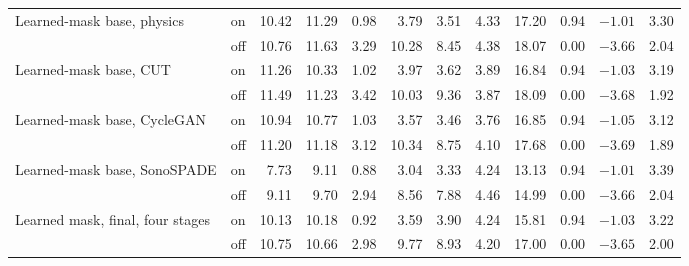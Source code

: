 \begin{table}[tbp]
\begin{tabular}{@{}l c rrr rrr r r r r@{}}
\addlinespace[2pt]
Learned-mask base, physics & on & 10.42 & 11.29 & 0.98 & 3.79 & 3.51 & 4.33 & 17.20 & 0.94 & $-1.01$ & 3.30 \\
 & off & 10.76 & 11.63 & 3.29 & 10.28 & 8.45 & 4.38 & 18.07 & 0.00 & $-3.66$ & 2.04 \\
\addlinespace[2pt]
Learned-mask base, CUT & on & 11.26 & 10.33 & 1.02 & 3.97 & 3.62 & 3.89 & 16.84 & 0.94 & $-1.03$ & 3.19 \\
 & off & 11.49 & 11.23 & 3.42 & 10.03 & 9.36 & 3.87 & 18.09 & 0.00 & $-3.68$ & 1.92 \\
\addlinespace[2pt]
Learned-mask base, CycleGAN & on & 10.94 & 10.77 & 1.03 & 3.57 & 3.46 & 3.76 & 16.85 & 0.94 & $-1.05$ & 3.12 \\
 & off & 11.20 & 11.18 & 3.12 & 10.34 & 8.75 & 4.10 & 17.68 & 0.00 & $-3.69$ & 1.89 \\
\addlinespace[2pt]
Learned-mask base, SonoSPADE & on & 7.73 & 9.11 & 0.88 & 3.04 & 3.33 & 4.24 & 13.13 & 0.94 & $-1.01$ & 3.39 \\
 & off & 9.11 & 9.70 & 2.94 & 8.56 & 7.88 & 4.46 & 14.99 & 0.00 & $-3.66$ & 2.04 \\
\addlinespace[2pt]
Learned mask, final, four stages & on & 10.13 & 10.18 & 0.92 & 3.59 & 3.90 & 4.24 & 15.81 & 0.94 & $-1.03$ & 3.22 \\
 & off & 10.75 & 10.66 & 2.98 & 9.77 & 8.93 & 4.20 & 17.00 & 0.00 & $-3.65$ & 2.00 \\
\bottomrule
\end{tabular}
\end{table}
